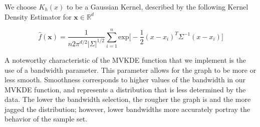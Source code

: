 \documentclass[letterpaper,12pt]{article}
\theoremstyle{definition}
\begin{document}
\begin{spacing}{1.5}
    We choose $K_h(x)$ to be a Gaussian Kernel, described by the following Kernel Density Estimator for $\mathbf{x} \in \mathbb{R}^d$

    \[\hat{f}(\mathbf{x}) = \frac{1}{n2\pi ^{d/2} |\Sigma|^{1/2}} \sum_{i=1}^n \text{exp}\big[-\frac{1}{2}(x-x_i)^T\Sigma ^{-1}(x-x_i)\big]\]
    \citet{Scott:2005}

    A noteworthy characteristic of the MVKDE function that we implement is the use of a bandwidth parameter. This parameter allows for the graph to be more or less smooth. Smoothness corresponds to higher values of the bandwidth in our MVKDE function, and represents a distribution that is less determined by the data. The lower the bandwidth selection, the rougher the graph is and the more jagged the distribution; however, lower bandwidths more accurately portray the behavior of the sample set.










\end{spacing}
\end{document}
